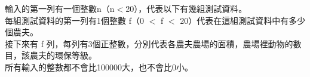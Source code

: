 輸入的第一列有一個整數n（n$<$20），代表以下有幾組測試資料。\\
每組測試資料的第一列有1個整數 f（0 $<$ f $<$ 20）代表在這組測試資料中有多少個農夫。\\
接下來有 f 列，每列有3個正整數，分別代表各農夫農場的面積，農場裡動物的數目，該農夫的環保等級。\\
所有輸入的整數都不會比100000大，也不會比0小。\\
